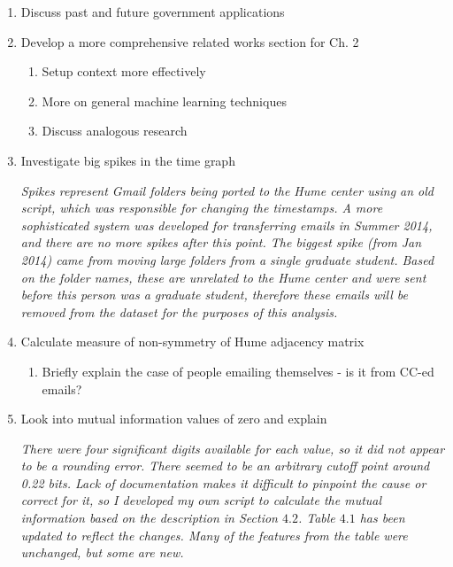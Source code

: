 \documentclass[12pt]{report}
\begin{document}
\begin{enumerate}
    \item Discuss past and future government applications

    \item Develop a more comprehensive related works section for Ch. 2
    \begin{enumerate}
        \item Setup context more effectively
        \item More on general machine learning techniques
        \item Discuss analogous research
    \end{enumerate}

    \item Investigate big spikes in the time graph

        \par \textit{Spikes represent Gmail folders being ported to the Hume center using an old script, which was responsible for changing the timestamps.  A more sophisticated system was developed for transferring emails in Summer 2014, and there are no more spikes after this point.  The biggest spike (from Jan 2014) came from moving large folders from a single graduate student.  Based on the folder names, these are unrelated to the Hume center and were sent before this person was a graduate student, therefore these emails will be removed from the dataset for the purposes of this analysis.}


    \item Calculate measure of non-symmetry of Hume adjacency matrix
    \begin{enumerate}
		\item Briefly explain the case of people emailing themselves - is it from CC-ed emails?
	\end{enumerate}
	
	\item Look into mutual information values of zero and explain 
	
    	\par \textit{There were four significant digits available for each value, so it did not appear to be a rounding error.  There seemed to be an arbitrary cutoff point around 0.22 bits.  Lack of documentation makes it difficult to pinpoint the cause or correct for it, so I developed my own script to calculate the mutual information based on the description in Section $4.2$.  Table $4.1$ has been updated to reflect the changes.  Many of the features from the table were unchanged, but some are new.}


\end{enumerate}
\end{document}
